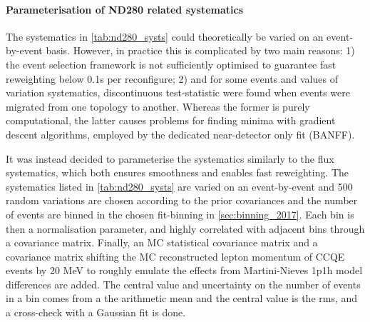 \paragraph{Parameterisation of ND280 related systematics}
The systematics in \autoref{tab:nd280_systs} could theoretically be varied on an event-by-event basis. However, in practice this is complicated by two main reasons: 1) the event selection framework is not sufficiently optimised to guarantee fast reweighting below 0.1s per reconfigure; 2) and for some events and values of variation systematics, discontinuous test-statistic were found when events were migrated from one topology to another. Whereas the former is purely computational, the latter causes problems for finding minima with gradient descent algorithms, employed by the dedicated near-detector only fit (BANFF). 

It was instead decided to parameterise the systematics similarly to the flux systematics, which both ensures smoothness and enables fast reweighting. The systematics listed in \autoref{tab:nd280_systs} are varied on an event-by-event and 500 random variations are chosen according to the prior covariances and the number of events are binned in the chosen fit-binning in \autoref{sec:binning_2017}. Each bin is then a normalisation parameter, and highly correlated with adjacent bins through a covariance matrix. Finally, an MC statistical covariance matrix and a covariance matrix shifting the MC reconstructed lepton momentum of CCQE events by 20 MeV to roughly emulate the effects from Martini-Nieves 1p1h model differences are added. The central value and uncertainty on the number of events in a bin comes from a the arithmetic mean and the central value is the rms, and a cross-check with a Gaussian fit is done.

